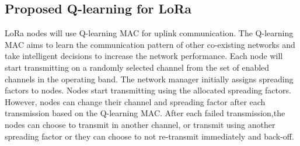 


 
\subsection{Proposed Q-learning  for LoRa}
LoRa nodes will use Q-learning MAC for uplink communication. The Q-learning MAC aims to learn the communication pattern of other co-existing networks and take intelligent decisions to increase the network performance. Each node will start transmitting on a randomly selected channel from the set of enabled channels in the operating band. The network manager initially assigns spreading factors to nodes. Nodes start transmitting using the allocated spreading factors. However, nodes can change their channel and spreading factor after each transmission based on the Q-learning MAC. After each failed transmission,the nodes can choose to transmit in another channel, or transmit using another spreading factor or they can choose to not re-transmit immediately and back-off. 

